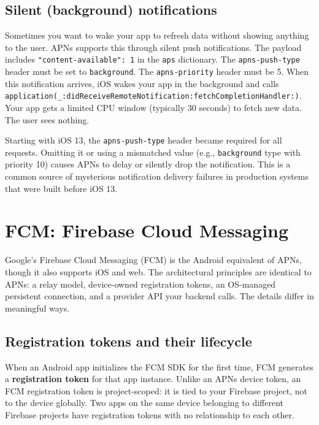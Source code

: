 \documentclass[11pt,a4paper]{article}
\begin{document}
\subsection{Silent (background) notifications}

Sometimes you want to wake your app to refresh data without showing anything to the user. APNs supports this through silent push notifications. The payload includes \texttt{"content-available": 1} in the \texttt{aps} dictionary. The \texttt{apns-push-type} header must be set to \texttt{background}. The \texttt{apns-priority} header must be 5. When this notification arrives, iOS wakes your app in the background and calls \texttt{application(\_:didReceiveRemoteNotification:\allowbreak{}fetchCompletionHandler:)}. Your app gets a limited CPU window (typically 30 seconds) to fetch new data. The user sees nothing.

Starting with iOS 13, the \texttt{apns-push-type} header became required for all requests. Omitting it or using a mismatched value (e.g., \texttt{background} type with priority 10) causes APNs to delay or silently drop the notification. This is a common source of mysterious notification delivery failures in production systems that were built before iOS 13.

\section{FCM: Firebase Cloud Messaging}

Google's Firebase Cloud Messaging (FCM) is the Android equivalent of APNs, though it also supports iOS and web. The architectural principles are identical to APNs: a relay model, device-owned registration tokens, an OS-managed persistent connection, and a provider API your backend calls. The details differ in meaningful ways.

\subsection{Registration tokens and their lifecycle}

When an Android app initializes the FCM SDK for the first time, FCM generates a \textbf{registration token} for that app instance. Unlike an APNs device token, an FCM registration token is project-scoped: it is tied to your Firebase project, not to the device globally. Two apps on the same device belonging to different Firebase projects have registration tokens with no relationship to each other.
\end{document}
